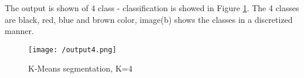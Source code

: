 \documentclass[a4paper, 10pt]{article}
\begin{document}
\begin{multicols}{2}
	The output is shown of 4 class - classification is showed in Figure \ref{fig:op4}. The 4 classes are black, red, blue and brown color, image(b) shows the classes in a discretized manner.
	
	\begin{figure}[H]
		\centering
		\texttt{[image: /output4.png]}
		\caption{K-Means segmentation, K=4}
		\label{fig:op4}
	\end{figure}
		
	\end{multicols}
	
\end{document}
